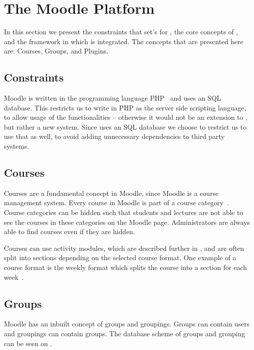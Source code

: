 \section{The Moodle Platform}
\label{sec:moodleplatform}
In this section we present the constraints that \moodle{} set's for \system{}, the core concepts of \moodle{}, and the framework in which \system{} is integrated.
The concepts that are presented here are: Courses, Groups, and Plugins.

\subsection{Constraints}
\label{sub:constraints}
Moodle is written in the programming language PHP~\cite{moodleabout} and uses an SQL database.
This restricts us to write \system{} in PHP as the server side scripting language, to allow usage of the \moodle{} functionalities -- otherwise it would not be an extension to \moodle{}, but rather a new system.
Since \moodle{} uses an SQL database we choose to restrict us to use that as well, to avoid adding unnecessary dependencies to third party systems.


\subsection{Courses}
\label{sub:courses}
Courses are a fundamental concept in Moodle, since Moodle is a course management system.
Every course in Moodle is part of a course category~\cite{moodlecoursecategories}. 
Course categories can be hidden such that students and lectures are not able to see the courses in these categories on the Moodle page.
Administrators are always able to find courses even if they are hidden.

Courses can use activity modules, which are described further in , and are often split into sections depending on the selected course format.
One example of a course format is the weekly format which splits the course into a section for each week~\cite{moodlecourseformat}.

\subsection{Groups}
Moodle has an inbuilt concept of groups and groupings. 
Groups can contain users and groupings can contain groups. 
The database scheme of groups and grouping can be seen on .

